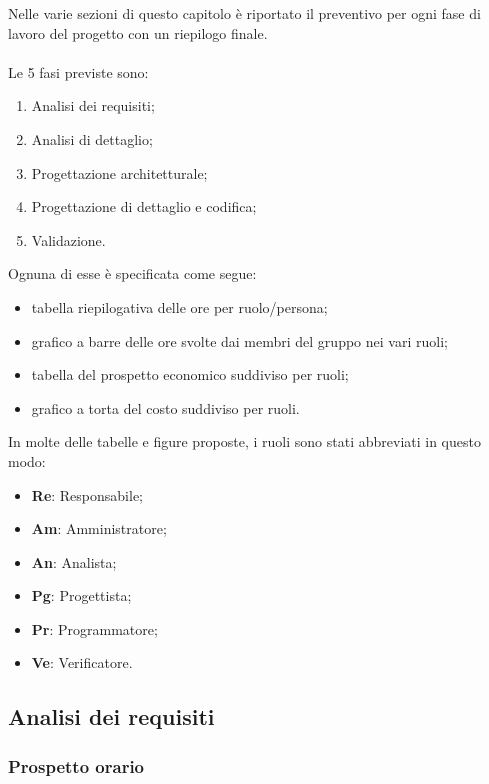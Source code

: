 
Nelle varie sezioni di questo capitolo è riportato il preventivo per ogni fase di lavoro del progetto con un riepilogo finale.\\
\\Le 5 fasi previste sono:
\begin{enumerate}
	\item Analisi dei requisiti;
	\item Analisi di dettaglio;
	\item Progettazione architetturale;
	\item Progettazione di dettaglio e codifica;
	\item Validazione.
\end{enumerate}
Ognuna di esse è specificata come segue:
\begin{itemize}
	\item tabella riepilogativa delle ore per ruolo/persona;
	\item grafico a barre delle ore svolte dai membri del gruppo nei vari ruoli;
	\item tabella del prospetto economico suddiviso per ruoli;
	\item grafico a torta del costo suddiviso per ruoli.
\end{itemize}
In molte delle tabelle e figure proposte, i ruoli sono stati abbreviati in questo modo:
\begin{itemize}
	\item \textbf{Re}: Responsabile;
	\item \textbf{Am}: Amministratore;
	\item \textbf{An}: Analista;
	\item \textbf{Pg}: Progettista;
	\item \textbf{Pr}: Programmatore;
	\item \textbf{Ve}: Verificatore.
\end{itemize}

\newpage

\subsection{Analisi dei requisiti}
	
	\subsubsection{Prospetto orario}
			
